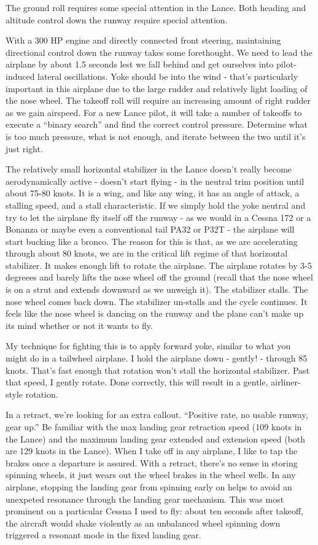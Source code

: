 The ground roll requires some special attention in the Lance. Both heading and altitude control down the runway require special attention.

With a 300 HP engine and directly connected front steering, maintaining directional control down the runway takes some forethought. We need to lead the airplane by about 1.5 seconds lest we fall behind and get ourselves into pilot-induced lateral oscillations. Yoke should be into the wind - that's particularly important in this airplane due to the large rudder and relatively light loading of the nose wheel. The takeoff roll will require an increasing amount of right rudder as we gain airspeed. For a new Lance pilot, it will take a number of takeoffs to execute a ``binary search'' and find the correct control pressure. Determine what is too much pressure, what is not enough, and iterate between the two until it's just right.

The relatively small horizontal stabilizer in the Lance doesn't really become aerodynamically active - doesn't start flying - in the neutral trim position until about 75-80 knots. It is a wing, and like any wing, it has an angle of attack, a stalling speed, and a stall characteristic. If we simply hold the yoke neutral and try to let the airplane fly itself off the runway - as we would in a Cessna 172 or a Bonanza or maybe even a conventional tail PA32 or P32T - the airplane will start bucking like a bronco. The reason for this is that, as we are accelerating through about 80 knots, we are in the critical lift regime of that horizontal stabilizer. It makes enough lift to rotate the airplane. The airplane rotates by 3-5 degreees and barely lifts the nose wheel off the ground (recall that the nose wheel is on a strut and extends downward as we unweigh it). The stabilizer stalls. The nose wheel comes back down. The stabilizer un-stalls and the cycle continues. It feels like the nose wheel is dancing on the runway and the plane can't make up its mind whether or not it wants to fly.

My technique for fighting this is to apply forward yoke, similar to what you might do in a tailwheel airplane. I hold the airplane down - gently! - through 85 knots. That's fast enough that rotation won't stall the horizontal stabilizer. Past that speed, I gently rotate. Done correctly, this will result in a gentle, airliner-style rotation.

In a retract, we're looking for an extra callout. ``Positive rate, no usable runway, gear up.'' Be familiar with the max landing gear retraction speed (109 knots in the Lance) and the maximum landing gear extended and extension speed (both are 129 knots in the Lance). When I take off in any airplane, I like to tap the brakes once a departure is assured. With a retract, there's no sense in storing spinning wheels, it just wears out the wheel brakes in the wheel wells. In any airplane, stopping the landing gear from spinning early on helps to avoid an unexpeted resonance through the landing gear mechanism. This was most prominent on a particular Cessna I used to fly: about ten seconds after takeoff, the aircraft would shake violently as an unbalanced wheel spinning down triggered a resonant mode in the fixed landing gear.

